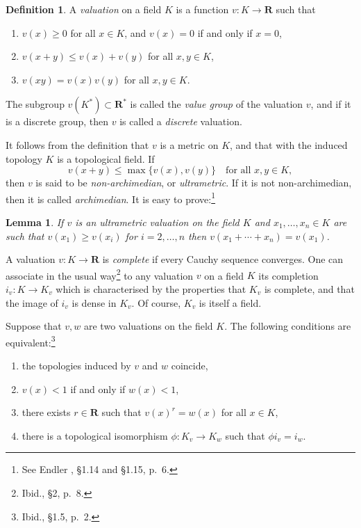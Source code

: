 \documentclass[10pt,leqno]{article}
\newtheorem{lemm}[theo]{Lemma}
\theoremstyle{definition}
\newtheorem{defi}[theo]{Definition}
\def\RR{\mathbf{R}}
\def\fnthsi{See Endler \cite{bib:58}, \S1.14 and \S1.15, p.~6.}
\def\fnthse{Ibid., \S2, p.~8.}
\def\fnthei{Ibid., \S1.5, p.~2.}
\begin{document}
\begin{defi}
\label{4.1.1}
A \emph{valuation} on a field $K$ is a function $v : K \to \RR$ such that
\begin{enumerate}
\item
\label{4.1.1.1}
$v(x) \geq 0$ for all $x \in K$, and $v(x) = 0$ if and only if $x = 0$,

\item
\label{4.1.1.2}
$v(x + y) \leq v(x) + v(y)$ for all $x,y \in K$,

\item
\label{4.1.1.3}
$v(xy) = v(x) v(y)$ for all $x,y \in K$.
\end{enumerate}
\end{defi}


The subgroup $v(K^*) \subset \RR^*$ is called the \emph{value group} of the valuation $v$, and if it is a discrete group, then $v$ is called a \emph{discrete} valuation.

It follows from the definition that $v$ is a metric on $K$, and that with the induced topology $K$ is a topological field.
If
\begin{equation}
\label{4.1.1.4}
v(x + y) \leq \max\{v(x), v(y) \}
\quad
\text{for all $x,y \in K$},
\end{equation}
then $v$ is said to be \emph{non-archimedian}, or \emph{ultrametric}.
If it is not non-archimedian, then it is called \emph{archimedian}.
It is easy to prove:\footnote{\fnthsi}


\begin{lemm}
\label{4.1.2}
If $v$ is an ultrametric valuation on the field $K$ and $x_1,\ldots,x_n \in K$ are such that $v(x_1) \geq v(x_i)$ for $i=2,\ldots,n$ then $v(x_1 + \cdots + x_n) = v(x_1)$.
\end{lemm}

A valuation $v : K \to \RR$ is \emph{complete} if every Cauchy sequence converges.
One can associate in the usual way\footnote{\fnthse} to any valuation $v$ on a field $K$ its completion $i_v : K \to K_v$ which is characterised by the properties that $K_v$ is complete, and that the image of $i_v$ is dense in $K_v$.
Of course, $K_v$ is itself a field.

Suppose that $v,w$ are two valuations on the field $K$.
The following conditions are equivalent:\footnote{\fnthei}
\begin{enumerate}
\item
\label{4.1.3.1}
the topologies induced by $v$ and $w$ coincide,

\item
\label{4.1.3.2}
$v(x) < 1$ if and only if $w(x) < 1$,

\item
\label{4.1.3.3}
there exists $r \in \RR$ such that $v(x)^r = w(x)$ for all $x \in K$,

\item
\label{4.1.3.4}
there is a topological isomorphism $\phi : K_v \to K_w$ such that $\phi i_v = i_w$.
\end{enumerate}
\end{document}
